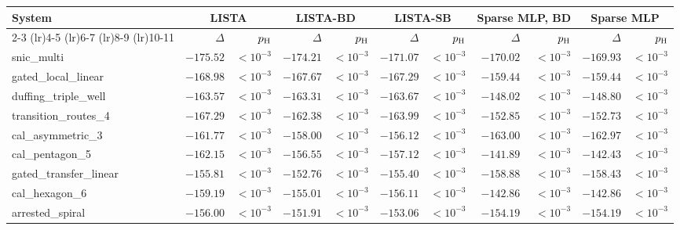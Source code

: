 \begin{tabular}{@{}l rr rr rr rr rr@{}}
\toprule
System & \multicolumn{2}{c}{LISTA} & \multicolumn{2}{c}{LISTA-BD} & \multicolumn{2}{c}{LISTA-SB} & \multicolumn{2}{c}{Sparse MLP, BD} & \multicolumn{2}{c}{Sparse MLP} \\
\cmidrule(lr){2-3} \cmidrule(lr){4-5} \cmidrule(lr){6-7} \cmidrule(lr){8-9} \cmidrule(lr){10-11}
 & $\Delta$ & $p_{\rm H}$ & $\Delta$ & $p_{\rm H}$ & $\Delta$ & $p_{\rm H}$ & $\Delta$ & $p_{\rm H}$ & $\Delta$ & $p_{\rm H}$ \\
\midrule
snic\_multi & $\mathbf{-175.52}$ & $<\!10^{-3}$ & $\mathbf{-174.21}$ & $<\!10^{-3}$ & $\mathbf{-171.07}$ & $<\!10^{-3}$ & $\mathbf{-170.02}$ & $<\!10^{-3}$ & $\mathbf{-169.93}$ & $<\!10^{-3}$ \\
gated\_local\_linear & $\mathbf{-168.98}$ & $<\!10^{-3}$ & $\mathbf{-167.67}$ & $<\!10^{-3}$ & $\mathbf{-167.29}$ & $<\!10^{-3}$ & $\mathbf{-159.44}$ & $<\!10^{-3}$ & $\mathbf{-159.44}$ & $<\!10^{-3}$ \\
duffing\_triple\_well & $\mathbf{-163.57}$ & $<\!10^{-3}$ & $\mathbf{-163.31}$ & $<\!10^{-3}$ & $\mathbf{-163.67}$ & $<\!10^{-3}$ & $\mathbf{-148.02}$ & $<\!10^{-3}$ & $\mathbf{-148.80}$ & $<\!10^{-3}$ \\
transition\_routes\_4 & $\mathbf{-167.29}$ & $<\!10^{-3}$ & $\mathbf{-162.38}$ & $<\!10^{-3}$ & $\mathbf{-163.99}$ & $<\!10^{-3}$ & $\mathbf{-152.85}$ & $<\!10^{-3}$ & $\mathbf{-152.73}$ & $<\!10^{-3}$ \\
cal\_asymmetric\_3 & $\mathbf{-161.77}$ & $<\!10^{-3}$ & $\mathbf{-158.00}$ & $<\!10^{-3}$ & $\mathbf{-156.12}$ & $<\!10^{-3}$ & $\mathbf{-163.00}$ & $<\!10^{-3}$ & $\mathbf{-162.97}$ & $<\!10^{-3}$ \\
cal\_pentagon\_5 & $\mathbf{-162.15}$ & $<\!10^{-3}$ & $\mathbf{-156.55}$ & $<\!10^{-3}$ & $\mathbf{-157.12}$ & $<\!10^{-3}$ & $\mathbf{-141.89}$ & $<\!10^{-3}$ & $\mathbf{-142.43}$ & $<\!10^{-3}$ \\
gated\_transfer\_linear & $\mathbf{-155.81}$ & $<\!10^{-3}$ & $\mathbf{-152.76}$ & $<\!10^{-3}$ & $\mathbf{-155.40}$ & $<\!10^{-3}$ & $\mathbf{-158.88}$ & $<\!10^{-3}$ & $\mathbf{-158.43}$ & $<\!10^{-3}$ \\
cal\_hexagon\_6 & $\mathbf{-159.19}$ & $<\!10^{-3}$ & $\mathbf{-155.01}$ & $<\!10^{-3}$ & $\mathbf{-156.11}$ & $<\!10^{-3}$ & $\mathbf{-142.86}$ & $<\!10^{-3}$ & $\mathbf{-142.86}$ & $<\!10^{-3}$ \\
arrested\_spiral & $\mathbf{-156.00}$ & $<\!10^{-3}$ & $\mathbf{-151.91}$ & $<\!10^{-3}$ & $\mathbf{-153.06}$ & $<\!10^{-3}$ & $\mathbf{-154.19}$ & $<\!10^{-3}$ & $\mathbf{-154.19}$ & $<\!10^{-3}$ \\

\end{tabular}
